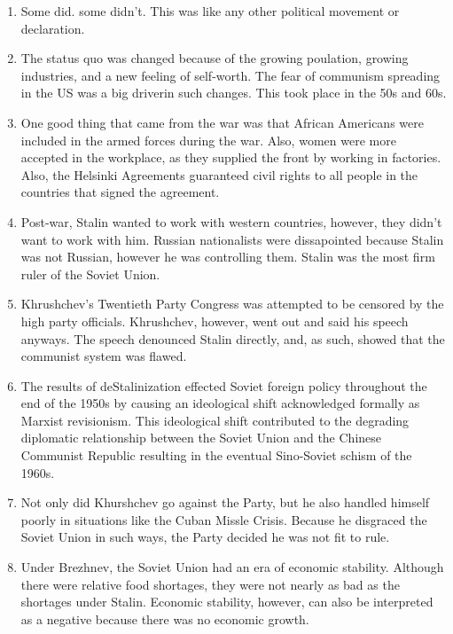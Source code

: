 \documentclass[12pt]{article}
\begin{document}
\begin{flushleft}
\begin{enumerate}
    \item Some did. some didn't. This was like any other political movement or declaration.

    \item The status quo was changed because of the growing poulation, growing industries, and a new feeling of self-worth. The fear of communism spreading in the US was a big driverin such changes. This took place in the 50s and 60s.

    \item One good thing that came from the war was that African Americans were included in the armed forces during the war. Also, women were more accepted in the workplace, as they supplied the front by working in factories. Also, the Helsinki Agreements guaranteed civil rights to all people in the countries that signed the agreement.

    \item Post-war, Stalin wanted to work with western countries, however, they didn't want to work with him. Russian nationalists were dissapointed because Stalin was not Russian, however he was controlling them. Stalin was the most firm ruler of the Soviet Union.

    \item Khrushchev's Twentieth Party Congress was attempted to be censored by the high party officials. Khrushchev, however, went out and said his speech anyways. The speech denounced Stalin directly, and, as such, showed that the communist system was flawed.

    \item The results of deStalinization effected Soviet foreign policy throughout the end of the 1950s by causing an ideological shift acknowledged formally as Marxist revisionism. This ideological shift contributed to the degrading diplomatic relationship between the Soviet Union and the Chinese Communist Republic resulting in the eventual Sino-Soviet schism of the 1960s.

    \item Not only did Khurshchev go against the Party, but he also handled himself poorly in situations like the Cuban Missle Crisis. Because he disgraced the Soviet Union in such ways, the Party decided he was not fit to rule.

    \item Under Brezhnev, the Soviet Union had an era of economic stability. Although there were relative food shortages, they were not nearly as bad as the shortages under Stalin. Economic stability, however, can also be interpreted as a negative because there was no economic growth.


\end{enumerate}
\end{flushleft}
\end{document}
